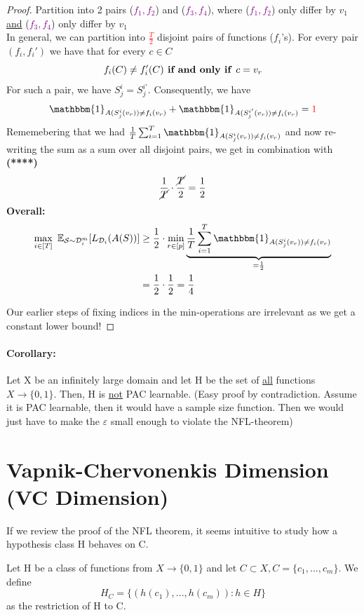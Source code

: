 \documentclass[10pt,a4paper]{article}
\theoremstyle{definition}
\theoremstyle{plain}
\begin{document}
\begin{proof}
Partition into 2 pairs (\textcolor{purple}{$f_1, f_2$}) and (\textcolor{purple}{$f_3, f_4$}), where (\textcolor{purple}{$f_1, f_2$}) only differ by $v_1$ \underline{and} (\textcolor{purple}{$f_3, f_4$}) only differ by $v_1$\\
In general, we can partition into \textcolor{red}{$\frac{T}{2}$} disjoint pairs of functions ($f_i$'s). For every pair $(f_i, f_i')$ we have that for every $c \in C$
$$
	f_i(C) \neq f_i'(C) \text{\textbf{ if and only if }} c = v_r
$$
For such a pair, we have $S_j^{i} = S_{j}^{i'}$. Consequently, we have 
$$
	\mathbbm{1}_{A(S_j^i(v_r)) \neq f_i(v_r)} + \mathbbm{1}_{A(S_j^{i'}(v_r)) \neq f_i(v_r)} = \textcolor{red}{1}
$$
Rememebering that we had $\frac{1}{T} \sum_{i=1}^{T} \mathbbm{1}_{A(S_j^i(v_r)) \neq f_i(v_r)}$ and now re-writing the sum as a  sum over all disjoint pairs, we get in combination with \textbf{(****)}
$$
 \frac{1}{\cancel{T}} \cdot \frac{\cancel{T}}{2} = \frac{1}{2}
$$
\textbf{Overall:}
\begin{align*}
	\max_{i \in [T]} \ \mathbb{E}_{\mathcal{S} \sim \mathcal{D}_i^m}[L_{\mathcal{D}_i}(A(S))]  &\geq \frac{1}{2} \cdot  \min_{r \in [p]} \underbrace{\frac{1}{T} \sum_{i=1}^{T} \mathbbm{1}_{A(S_j^i(v_r)) \neq f_i(v_r)}}_{\mathclap{ = \frac{1}{2}}}\\
	&= \frac{1}{2} \cdot \frac{1}{2} = \frac{1}{4}
\end{align*}

Our earlier steps of fixing indices in the min-operations are irrelevant as we get a constant lower bound!
\end{proof}
\paragraph{Corollary:} Let X be an infinitely large domain and let H be the set of \underline{all} functions $X \to \{0,1\}$. Then, H is \underline{not} PAC learnable. (Easy proof by contradiction. Assume it is PAC learnable, then it would have a sample size function. Then we would just have to make the $\varepsilon$ small enough to violate the NFL-theorem) 

\section*{Vapnik-Chervonenkis Dimension (VC Dimension)}
If we review the proof of the NFL theorem, it seems intuitive to study how a hypothesis class H behaves on C.
\begin{boxeddef}
	Let H be a class of functions from $X \to \{0,1\}$ and let $C \subset X, C = \{c_1, ..., c_m \}$. We define 
	$$ H_C = \{ (h(c_1), ..., h(c_m)): h \in H\} $$
	as the restriction of H to C.
\end{boxeddef}
\end{document}
